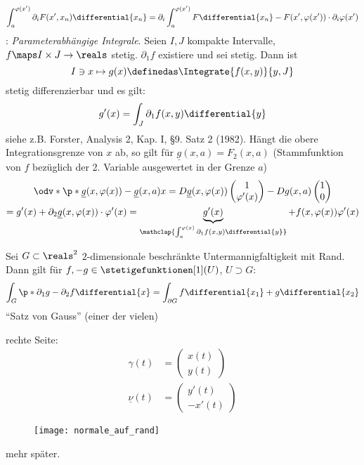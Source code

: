 \begin{bemerkung*}
\begin{equation*}
    \int_{a}^{\varphi(x')}\partial_i F(x',x_n)\differential{x_n}=\partial_i\int_{a}^{\varphi(x')}F\differential{x_n}-F(x',\varphi(x'))\cdot \partial_i\varphi(x')
\end{equation*}
: \emph{Parameterabhängige Integrale}.
Seien \( I,J \) kompakte Intervalle, \( f\maps I\times J\to \reals \) stetig.
\( \partial_1f \) existiere und sei stetig.
Dann ist 
\begin{equation*}
    I\ni x \mapsto g(x)\definedas \Integrate{ f(x,y)}{y,J}
\end{equation*}
stetig differenzierbar und es gilt:
\begin{equation*}
    g'(x)=\int_J\partial_1f(x,y)\differential{y}
\end{equation*}
siehe z.B. Forster, Analysis 2, Kap. I, §9. Satz 2 (1982).
Hängt die obere Integrationsgrenze von \( x \) ab, so gilt für \( \underline{g}(x,a)=F_2(x,a) \) (Stammfunktion von \( f \) bezüglich der 2. Variable ausgewertet in der Grenze \( a \))
\begin{gather*}
    \odv*{\p*{ \underline{g}(x,\varphi(x)) - \underline{g}(x,a) }}{x}= D\underline{g}(x,\varphi(x))\begin{pmatrix} 1\\\varphi'(x) \end{pmatrix} -Dg(x,a)\begin{pmatrix} 1\\0 \end{pmatrix} \\
    =g'(x)+\partial_2\underline{g}(x,\varphi(x))\cdot \varphi'(x)=\underbrace{g'(x)}_{\mathclap{\int_{a}^{\varphi(x)}\partial_1f(x,y)\differential{y}}}+f(x,\varphi(x))\varphi'(x)
\end{gather*}
\end{bemerkung*}

\begin{folgnotation}
Sei \( G\subset\reals^2 \) \( 2 \)-dimensionale beschränkte Untermannigfaltigkeit mit Rand.
Dann gilt für \( f,-g\in \stetigefunktionen[1](U) \), \(  U\supset G \):
\begin{equation*}
   \int_{G}\p*{ \partial_1g-\partial_2f }\differential{x}=\int_{\partial G}f\differential{x_1}+g\differential{x_2}
\end{equation*}
\enquote{Satz von Gauss} (einer der vielen)

rechte Seite: \begin{align*}
    \gamma(t)&= \begin{pmatrix} x(t)\\y(t) \end{pmatrix} \\
    \underline{\nu}(t)&= \begin{pmatrix} y'(t)\\-x'(t) \end{pmatrix} 
\end{align*}
\begin{figure}[H]
  \centering
  \texttt{[image: normale\_auf\_rand]}
  \label{fig:normale_auf_rand}
\end{figure}
mehr später.
\end{folgnotation}

